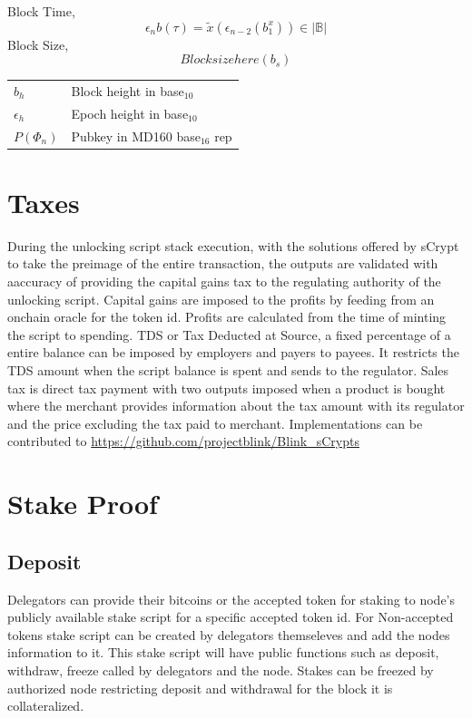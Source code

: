 \documentclass[a4paper,10pt]{article}
\makeatletter
\newenvironment{conditions}
  {\par\vspace{\abovedisplayskip}\noindent\begin{tabular}{>{$}l<{$} @{${}={}$} l}}
  {\end{tabular}\par\vspace{\belowdisplayskip}}
\makeatother
\begin{document}
Block Time,
\begin{equation*}
\epsilon_n b(\tau) = \widetilde{x}(\epsilon_{n-2}(b_1^x)) \in |\mathbb{B}|
\end{equation*}
Block Size,
\begin{equation*}
Block size here (b_s)
\end{equation*}
\begin{conditions}
b_h & Block height in base$_{10}$\\
\epsilon_h & Epoch height in base$_{10}$\\
P(\Phi_n) & Pubkey in MD160 base$_{16}$ rep
\end{conditions}
\section{Taxes}
During the unlocking script stack execution, with the solutions offered by sCrypt to take the preimage of the entire transaction, the outputs are validated with aaccuracy of providing the capital gains tax to the regulating authority of the unlocking script. Capital gains are imposed to the profits by feeding from an onchain oracle for the token id. Profits are calculated from the time of minting the script to spending. TDS or Tax Deducted at Source, a fixed percentage of a entire balance can be imposed by employers and payers to payees. It restricts the TDS amount when the script balance is spent and sends to the regulator. Sales tax is direct tax payment with two outputs imposed when a product is bought where the merchant provides information about the tax amount with its regulator and the price excluding the tax paid to merchant. Implementations can be contributed to \url{https://github.com/projectblink/Blink_sCrypts} 
\section{Stake Proof}
\subsection{Deposit}
Delegators can provide their bitcoins or the accepted token for staking to node's publicly available stake script for a specific accepted token id. For Non-accepted tokens stake script can be created by delegators themseleves and add the nodes information to it. 
This stake script will have public functions such as deposit, withdraw, freeze called by delegators and the node. Stakes can be freezed by authorized node restricting deposit and withdrawal for the block it is collateralized. 
\end{document}
